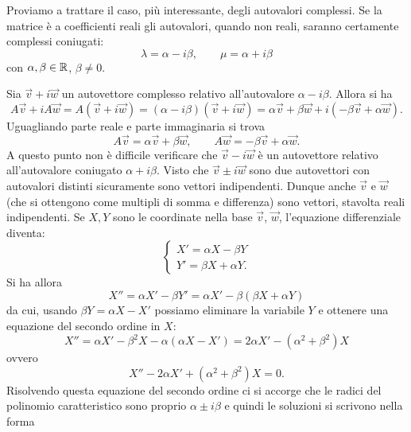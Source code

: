 Proviamo a trattare il caso, più interessante,
degli autovalori complessi. Se la matrice è a coefficienti
reali gli autovalori, quando
non reali, saranno certamente complessi coniugati:
\[
  \lambda = \alpha - i \beta,
  \qquad
  \mu = \alpha + i \beta
\]
con $\alpha,\beta\in {\mathbb R}$, $\beta\neq 0$.

Sia $\vec v + i \vec w$ un autovettore complesso relativo
all'autovalore $\alpha - i \beta$.
Allora si ha
\[
 A\vec v + i A \vec w
 = A(\vec v + i \vec w)
 = (\alpha - i \beta)(\vec v + i \vec w)
 = \alpha \vec v + \beta \vec w +i(-\beta \vec v + \alpha \vec w).
\]
Uguagliando parte reale e parte immaginaria si trova
\[
  A \vec v = \alpha \vec v + \beta \vec w,
  \qquad
  A \vec w = -\beta \vec v + \alpha \vec w.
\]
A questo punto non è difficile verificare che $\vec v - i \vec w$
è un autovettore relativo all'autovalore coniugato $\alpha + i\beta$.
Visto che $\vec v\pm i\vec w$ sono due autovettori con autovalori
distinti sicuramente sono vettori indipendenti.
Dunque anche $\vec v$ e $\vec w$
(che si ottengono come multipli di somma e differenza)
sono vettori, stavolta reali
indipendenti.
Se $X,Y$ sono le coordinate nella base $\vec v$, $\vec w$, l'equazione
differenziale diventa:
\[
\begin{cases}
 X' = \alpha X - \beta Y \\
 Y' = \beta X + \alpha Y.
\end{cases}
\]
Si ha allora%
\[
 X'' = \alpha X' - \beta Y'
 = \alpha X' - \beta (\beta X + \alpha Y)
\]
da cui, usando $\beta Y = \alpha X - X'$ possiamo eliminare la variabile $Y$
e ottenere una equazione del secondo ordine in $X$:
\[
 X'' = \alpha X' - \beta^2 X - \alpha (\alpha X - X')
  = 2 \alpha X' - (\alpha^2+\beta^2) X
\]
ovvero
\[
 X'' - 2 \alpha X' + (\alpha^2 + \beta^2) X = 0.
\]
Risolvendo questa equazione del secondo ordine ci si accorge
che le radici del polinomio caratteristico sono proprio $\alpha \pm i \beta$
e quindi le soluzioni si scrivono nella forma
